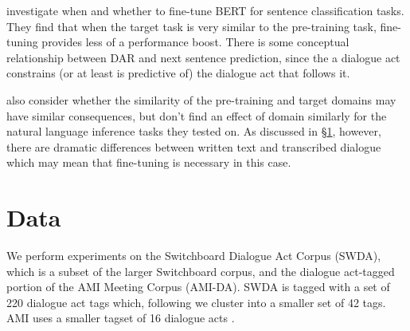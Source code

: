 \documentclass[11pt,a4paper]{article}
\begin{document}
\citet{petersTuneNotTune2019} investigate when and whether to fine-tune BERT for sentence classification tasks.
They find that when the target task is very similar to the pre-training task, fine-tuning provides less of a performance boost.
There is some conceptual relationship between DAR and next sentence prediction, since the a dialogue act constrains (or at least is predictive of) the dialogue act that follows it.

\citet{petersTuneNotTune2019} also consider whether the similarity of the pre-training and target domains may have similar consequences, but don't find an effect of domain similarly for the natural language inference tasks they tested on.
As discussed in \S\ref{sec:data}, however, there are dramatic differences between written text and transcribed dialogue which may mean that fine-tuning is necessary in this case.




\section{Data}\label{sec:data}
We perform experiments on the Switchboard Dialogue Act Corpus (SWDA), which is a subset of the larger Switchboard corpus, and the dialogue act-tagged portion of the AMI Meeting Corpus (AMI-DA). 
SWDA is tagged with a set of 220 dialogue act tags which, following  \citet{jurafskySwitchboardSWBDDAMSLShallowDiscourseFunction1997a} we cluster into a smaller set of 42 tags.
AMI uses a smaller tagset of 16 dialogue acts \citep{GuidelinesDialogueAct2005}.
\end{document}
